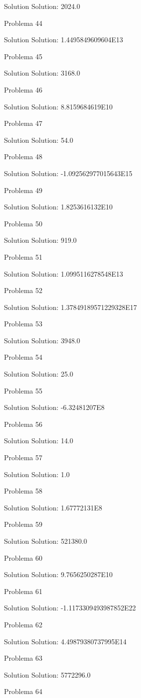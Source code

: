 \documentclass{article}
\begin{document}
Solution Solution: 2024.0

Problema 44

Solution Solution: 1.4495849609604E13

Problema 45

Solution Solution: 3168.0

Problema 46

Solution Solution: 8.8159684619E10

Problema 47

Solution Solution: 54.0

Problema 48

Solution Solution: -1.092562977015643E15

Problema 49

Solution Solution: 1.8253616132E10

Problema 50

Solution Solution: 919.0

Problema 51

Solution Solution: 1.0995116278548E13

Problema 52

Solution Solution: 1.37849189571229328E17

Problema 53

Solution Solution: 3948.0

Problema 54

Solution Solution: 25.0

Problema 55

Solution Solution: -6.32481207E8

Problema 56

Solution Solution: 14.0

Problema 57

Solution Solution: 1.0

Problema 58

Solution Solution: 1.67772131E8

Problema 59

Solution Solution: 521380.0

Problema 60

Solution Solution: 9.7656250287E10

Problema 61

Solution Solution: -1.1173309493987852E22

Problema 62

Solution Solution: 4.49879380737995E14

Problema 63

Solution Solution: 5772296.0

Problema 64
\end{document}
